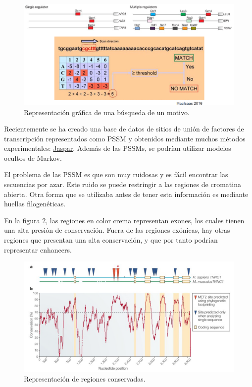 \begin{figure}[htbp]
\centering
\includegraphics[width = \textwidth]{figs/motif-location.png}
\caption{Representación gráfica de una búsqueda de un motivo.}
\label{fig:motif-location}
\end{figure}

Recientemente se ha creado una base de datos de sitios de unión de factores de transcripción representados como PSSM y obtenidos mediante muchos métodos experimentales: \href{https://jaspar.genereg.net/}{Jaspar}. Además de las PSSMs, se podrían utilizar modelos ocultos de Markov. 

El problema de las PSSM es que son muy ruidosas y es fácil encontrar las secuencias por azar. Este ruido se puede restringir a las regiones de cromatina abierta. Otra forma que se utilizaba antes de tener esta información es mediante huellas filogenéticas. 

En la figura \ref{fig:conservation}, las regiones en color crema representan exones, los cuales tienen una alta presión de conservación. Fuera de las regiones exónicas, hay otras regiones que presentan una alta conservación, y que por tanto podrían representar enhancers. 

\begin{figure}[htbp]
\centering
\includegraphics[width = \textwidth]{figs/noise-reduction.png}
\caption{Representación de regiones conservadas.}
\label{fig:conservation}
\end{figure}

